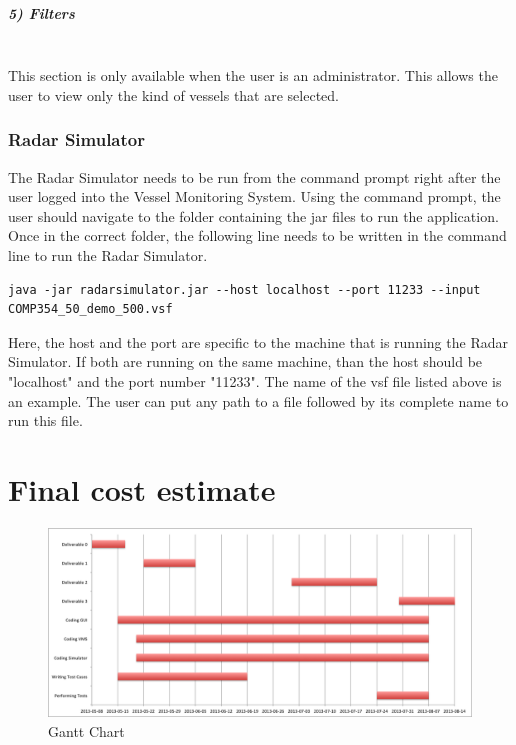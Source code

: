 \documentclass{article}
\begin{document}
\subparagraph{5) Filters \\ \\}
This section is only available when the user is an administrator. This allows the user to view only the kind of vessels that are selected.\\

\subsubsection{Radar Simulator}
The Radar Simulator needs to be run from the command prompt right after the user logged into the Vessel Monitoring System. Using the command prompt, the user should navigate to the folder containing the jar files to run the application. Once in the correct folder, the following line needs to be written in the command line to run the Radar Simulator.

\begin{verbatim}
java -jar radarsimulator.jar --host localhost --port 11233 --input COMP354_50_demo_500.vsf
\end{verbatim}

Here, the host and the port are specific to the machine that is running the Radar Simulator. If both are running on the same machine, than the host should be "localhost" and the port number "11233". The name of the vsf file listed above is an example. The user can put any path to a file followed by its complete name to run this file.

\break

\section{Final cost estimate} %


\begin{figure}[!htb]
\caption{Gantt Chart}
\centering
\includegraphics[scale=0.55]{charts/GanttChart.png}
\end{figure}
\end{document}
